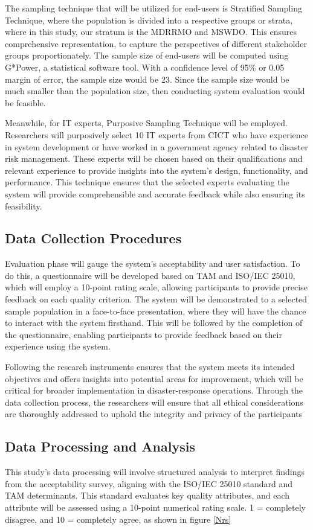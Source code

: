 	The sampling technique that will be utilized for end-users is Stratified Sampling Technique, where the population is divided into a respective groups or strata, where in this study, our stratum is the MDRRMO and MSWDO. This ensures comprehensive representation, to capture the perspectives of different stakeholder groups proportionately. The sample size of end-users will be computed using G*Power, a statistical software tool. With a confidence level of 95\% or 0.05 margin of error, the sample size would be 23. Since the sample size would be much smaller than the population size, then conducting system evaluation would be feasible.
	
	Meanwhile, for IT experts, Purposive Sampling Technique will be employed. Researchers will purposively select 10 IT experts from CICT who have experience in system development or have worked in a government agency related to disaster risk management. These experts will be chosen based on their qualifications and relevant experience to provide insights into the system's design, functionality, and performance. This technique ensures that the selected experts evaluating the system will provide comprehensible and accurate feedback while also ensuring its feasibility.
	
\subsection{Data Collection Procedures}
	Evaluation phase will gauge the system’s acceptability and user satisfaction. To do this, a questionnaire will be developed based on TAM and ISO/IEC 25010, which will employ a 10-point rating scale, allowing participants to provide precise feedback on each quality criterion. The system will be demonstrated to a selected sample population in a face-to-face presentation, where they will have the chance to interact with the system firsthand. This will be followed by the completion of the questionnaire, enabling participants to provide feedback based on their experience using the system.
	
	Following the research instruments ensures that the system meets its intended objectives and offers insights into potential areas for improvement, which will be critical for broader implementation in disaster-response operations. Through the data collection process, the researchers will ensure that all ethical considerations are thoroughly addressed to uphold the integrity and privacy of the participants

\subsection{Data Processing and Analysis}
	This study's data processing will involve structured analysis to interpret findings from the acceptability survey, aligning with the ISO/IEC 25010 standard and TAM determinants. This standard evaluates key quality attributes, and each attribute will be assessed using a 10-point numerical rating scale. 1 = completely disagree, and 10 = completely agree, as shown in figure \ref{Nrs}
	
